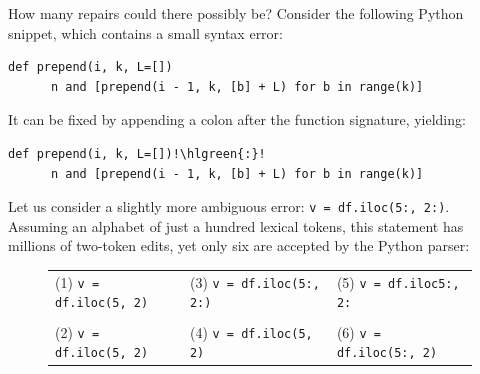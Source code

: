 \documentclass{beamer}
\begin{document}
\begin{frame}[t,fragile]{How many repairs could there possibly be?}
  Consider the following Python snippet, which contains a small syntax error:\\

  \begin{lstlisting}[escapechar=!, basicstyle=\linespread{1.3}\ttfamily\footnotesize]
    def prepend(i, k, L=[])
      n and [prepend(i - 1, k, [b] + L) for b in range(k)]
  \end{lstlisting}

  It can be fixed by appending a colon after the function signature, yielding:\\

  \begin{lstlisting}[escapechar=!, basicstyle=\linespread{1.3}\ttfamily\footnotesize]
    def prepend(i, k, L=[])!\hlgreen{:}!
      n and [prepend(i - 1, k, [b] + L) for b in range(k)]
  \end{lstlisting}

  \vspace{0.5cm}

  \normalsize Let us consider a slightly more ambiguous error: \footnotesize{\texttt{v = df.iloc(5:, 2:)}}. \normalsize Assuming an alphabet of just a hundred lexical tokens, this statement has millions of two-token edits, yet only six are accepted by the Python parser:

    \scriptsize
    \begin{figure}[h!]
      \noindent\begin{tabular}{@{}l@{\hspace{10pt}}l@{\hspace{10pt}}l@{}}
      (1) \texttt{v = df.iloc(5\hlred{:}, 2\hlorange{,})} & (3) \texttt{v = df.iloc(5\hlgreen{[}:, 2:\hlgreen{]})} & (5) \texttt{v = df.iloc\hlorange{[}5:, 2:\hlorange{]}} \\\\
      (2) \texttt{v = df.iloc(5\hlorange{)}, 2\hlorange{(})} & (4) \texttt{v = df.iloc(5\hlred{:}, 2\hlred{:})} & (6) \texttt{v = df.iloc(5\hlgreen{[}:, 2\hlorange{]})} \\
      \end{tabular}
    \end{figure}
\end{frame}
\end{document}
